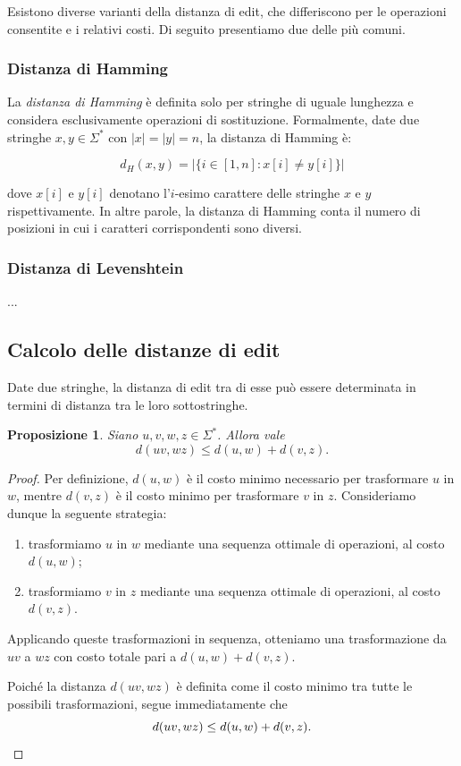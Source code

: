 \documentclass[a4paper,12pt]{report}
\theoremstyle{propositionstyle}
\newtheorem{prop}{Proposizione}[chapter]
\begin{document}
    Esistono diverse varianti della distanza di edit, che differiscono per le operazioni consentite e i relativi costi. Di seguito presentiamo due delle più comuni.
    
    \subsubsection{Distanza di Hamming}
    
    La \textit{distanza di Hamming} è definita solo per stringhe di uguale lunghezza e considera esclusivamente operazioni di sostituzione. Formalmente, date due stringhe $x, y \in \Sigma^*$ con $|x| = |y| = n$, la distanza di Hamming è:
    
    $$d_H(x, y) = |\{i \in [1, n] : x[i] \neq y[i]\}|$$
    
    dove $x[i]$ e $y[i]$ denotano l'$i$-esimo carattere delle stringhe $x$ e $y$ rispettivamente. In altre parole, la distanza di Hamming conta il numero di posizioni in cui i caratteri corrispondenti sono diversi.
    
    \subsubsection{Distanza di Levenshtein}
    
        ...

    \subsection{Calcolo delle distanze di edit}

    Date due stringhe, la distanza di edit tra di esse può essere determinata in termini di distanza tra le loro sottostringhe.

\begin{prop}
    Siano $u,v,w,z \in \Sigma^*$. Allora vale
    \[
        d(uv, wz) \leq d(u,w) + d(v,z).
    \]
\end{prop}

\begin{proof}
    Per definizione, $d(u,w)$ è il costo minimo necessario per trasformare $u$ in $w$, mentre $d(v,z)$ è il costo minimo per trasformare $v$ in $z$.
    Consideriamo dunque la seguente strategia:
    \begin{enumerate}
        \item trasformiamo $u$ in $w$ mediante una sequenza ottimale di operazioni, al costo $d(u,w)$;
        \item trasformiamo $v$ in $z$ mediante una sequenza ottimale di operazioni, al costo $d(v,z)$.
    \end{enumerate}
    Applicando queste trasformazioni in sequenza, otteniamo una trasformazione da $uv$ a $wz$ con costo totale pari a $d(u,w)+d(v,z)$.

    Poiché la distanza $d(uv,wz)$ è definita come il costo minimo tra tutte le possibili trasformazioni, segue immediatamente che
    \[
        d(uv, wz) \leq d(u,w) + d(v,z). \qedhere
    \]
\end{proof}
\end{document}
